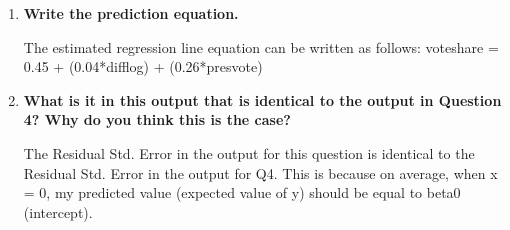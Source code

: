 \documentclass[12pt,letterpaper]{article}
\begin{document}
\begin{enumerate}
		
		\item \textbf{Write the prediction equation.}	\vspace{.25cm}
		
		\noindent The estimated regression line equation can be written as follows: 
		\newline voteshare = 0.45 + (0.04*difflog) + (0.26*presvote)
		
		\item \textbf{What is it in this output that is identical to the output in Question 4? Why do you think this is the case?}
		
		The Residual Std. Error	in the output for this question is identical to the Residual Std. Error in the output for Q4. 
		This is because on average, when x = 0, my predicted value (expected value of y) should be equal to beta0 (intercept).  
		
	\end{enumerate}
	
	
	
	
\end{document}
